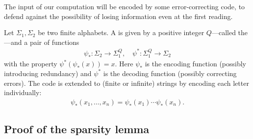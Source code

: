 \documentclass[11pt]{memoir}
\theoremstyle{definition} %
\newcommand{\Q}{Q} %
\begin{document}
The input of our computation will be encoded by some error-correcting code,
to defend against the possibility of losing information even at the first reading.

\begin{definition}[Codes]\label{def:codes}
    Let \( \Sigma_{1},\Sigma_{2} \) be two finite alphabets.
    A  is given by a positive integer \( \Q \)---called
    the ---and a pair of functions
    \begin{align*}
            \psi_{*} :\Sigma_{2}\to\Sigma_{1}^{\Q},
            \quad
            \psi^{*}:\Sigma_{1}^{\Q}\to\Sigma_{2}
    \end{align*}
    with the property \( \psi^{*}(\psi_{*}(x))=x \).
    Here \( \psi_{*} \) is the encoding function (possibly introducing redundancy)
    and \( \psi^{*} \) is the decoding function (possibly correcting errors).
    The code is extended to (finite or infinite) strings by encoding each letter individually:
\begin{align*}
 \psi_{*}(x_{1},\dots,x_{n})=\psi_{*}(x_{1})\dotsm\psi_{*}(x_{n}) .
\end{align*}

\end{definition}

\subsection{Proof of the sparsity lemma}
\end{document}
